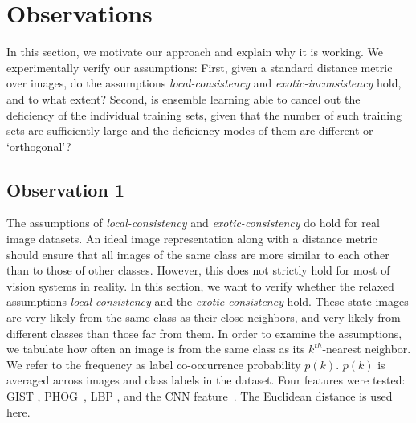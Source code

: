 




\section{Observations}
\label{en:sec:observations}

\label{en:sec:observation} In this section, we motivate our approach and explain why it is
working. We experimentally verify our assumptions: First, given a
standard distance metric over images, do the assumptions
\emph{local-con\-sist\-ency} and \emph{exotic-incon\-sistency}
hold, and to what extent? Second, is ensemble learning able to cancel
out the deficiency of the individual training sets, given that the
number of such training sets are sufficiently large and the deficiency
modes of them are different or `orthogonal'?

\subsection{Observation 1}
\label{en:sec:mov1}
The assumptions of \emph{local-consistency} and
\emph{exotic-consist\-ency} do hold for real image datasets.  An
ideal image representation along with a distance metric should ensure
that all images of the same class are more similar to each other
than to those of other classes. However, this does not strictly hold for
most of vision systems in reality. In this section, we want to verify
whether the relaxed assumptions 
\emph{local-consistency} and the \emph{exotic-consistency} hold. 
These state images are very likely from the same class as their close
neighbors, and very likely from different classes than those far from them. 
In order to examine the assumptions, we tabulate how often an
image is from the same class as its $k^{th}$-nearest neighbor.  We
refer to the frequency as label co-occurrence probability $p(k)$.
$p(k)$ is averaged across images and class labels in the dataset. Four
features were tested: GIST \citep{gist}, PHOG~\citep{Bosch:iccv07},
LBP \citep{Ojala02}, and the CNN feature~\citep{deep:bmvc14}. 
The Euclidean distance is used here.


